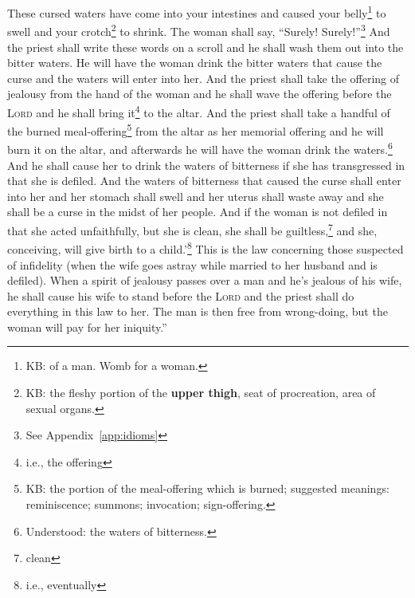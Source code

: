 \begin{inparaenum}
     These cursed waters have come into your intestines and caused your belly\footnote{KB: of a man. Womb for a woman.} to swell and your crotch\footnote{KB: the fleshy portion of the \textbf{upper thigh}, seat of procreation, area of sexual organs.} to shrink. The woman shall say, ``Surely! Surely!''\footnote{See Appendix~\ref{app:idioms}}%
     And the priest shall write these words on a scroll and he shall wash them out into the bitter waters.%
     He will have the woman drink the bitter waters that cause the curse and the waters will enter into her.%
     And the priest shall take the offering of jealousy from the hand of the woman and he shall wave the offering before the \textsc{Lord} and he shall bring it\footnote{i.e., the offering} to the altar.%
     And the priest shall take a handful of the burned meal-offering\footnote{KB: the portion of the meal-offering which is burned; suggested meanings: reminiscence; summons; invocation; sign-offering.} from the altar as her memorial offering and he will burn it on the altar, and afterwards he will have the woman drink the waters.\footnote{Understood: the waters of bitterness.}%
     And he shall cause her to drink the waters of bitterness if she has transgressed in that she is defiled. And the waters of bitterness that caused the curse shall enter into her and her stomach shall swell and her uterus shall waste away and she shall be a curse in the midst of her people.%
     And if the woman is not defiled in that she acted unfaithfully, but she is clean, she shall be guiltless,\footnote{clean} and she, conceiving, will give birth to a child.'\footnote{i.e., eventually}%
     This is the law concerning those suspected of infidelity (when the wife goes astray while married to her husband and is defiled).%
     When a spirit of jealousy passes over a man and he's jealous of his wife, he shall cause his wife to stand before the \textsc{Lord} and the priest shall do everything in this law to her.%
     The man is then free from wrong-doing, but the woman will pay for her iniquity.''%
\end{inparaenum}
